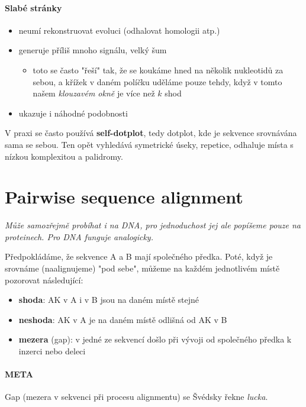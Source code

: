 \documentclass[DIV=8]{scrreprt}
\newcommand{\mybox}[2]{
    \paragraph{#1} #2
}
\begin{document}
\paragraph{Slabé stránky}
\begin{itemize}[nosep]
    \item neumí rekonstruovat evoluci (odhalovat homologii atp.)
    \item generuje příliš mnoho signálu, velký šum
\begin{itemize}[nosep]
    \item toto se často "řeší" tak, že se koukáme hned na několik nukleotidů za sebou, a křížek v daném políčku uděláme pouze tehdy, když v tomto našem \emph{klouzavém okně} je více než \(k\) shod
\end{itemize}

    \item ukazuje i náhodné podobnosti
\end{itemize}



V praxi se často používá \textbf{self-dotplot}, tedy dotplot, kde je sekvence srovnávána sama se sebou. Ten opět vyhledává symetrické úseky, repetice, odhaluje místa s nízkou komplexitou a palidromy.

\section{Pairwise sequence alignment} \label{Pairwise sequence alignment}


\emph{Může samozřejmě probíhat i na DNA, pro jednoduchost jej ale popíšeme pouze na proteinech. Pro DNA funguje analogicky.}

Předpokládáme, že sekvence A a B mají společného předka. Poté, když je srovnáme (naalignujeme) "pod sebe", můžeme na každém jednotlivém místě pozorovat následující:
\begin{itemize}[nosep]
    \item \textbf{shoda}: AK v A i v B jsou na daném místě stejné
    \item \textbf{neshoda}: AK v A je na daném místě odlišná od AK v B
    \item \textbf{mezera} (gap): v jedné ze sekvencí došlo při vývoji od společného předka k inzerci nebo deleci
\end{itemize}



\mybox{META}{Gap (mezera v sekvenci při procesu alignmentu) se Švédsky řekne \emph{lucka}.}
\end{document}
